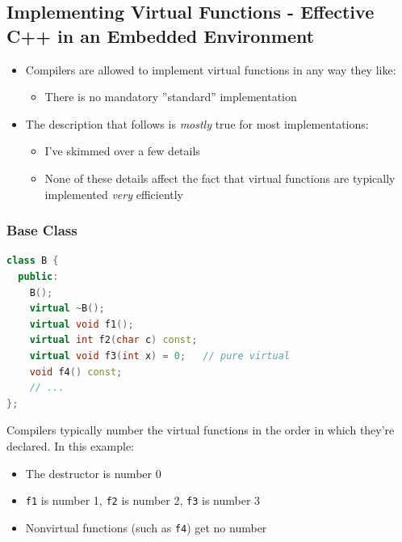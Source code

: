 \subsection{Implementing Virtual Functions - Effective C++ in an Embedded Environment}
\begin{itemize}
  \item Compilers are allowed to implement virtual functions in any way they like:
  \begin{itemize}
    \item There is no mandatory ''standard'' implementation
  \end{itemize}
  \item The description that follows is \textit{mostly} true for most implementations:
  \begin{itemize}
    \item I've skimmed over a few details
    \item None of these details affect the fact that virtual functions are typically implemented \textit{very} efficiently
  \end{itemize}
\end{itemize}

\subsubsection{Base Class}
\begin{lstlisting}[language=C++]
class B {
  public:
    B();
    virtual ~B();
    virtual void f1();
    virtual int f2(char c) const;
    virtual void f3(int x) = 0;   // pure virtual
    void f4() const;
    // ...
};
\end{lstlisting}
Compilers typically number the virtual functions in the order in which they're declared. In this example:
\begin{itemize}
  \item The destructor is number 0
  \item \lstinline{f1} is number 1, \lstinline{f2} is number 2, \lstinline{f3} is number 3
  \item Nonvirtual functions (such as \lstinline{f4}) get no number
\end{itemize}

